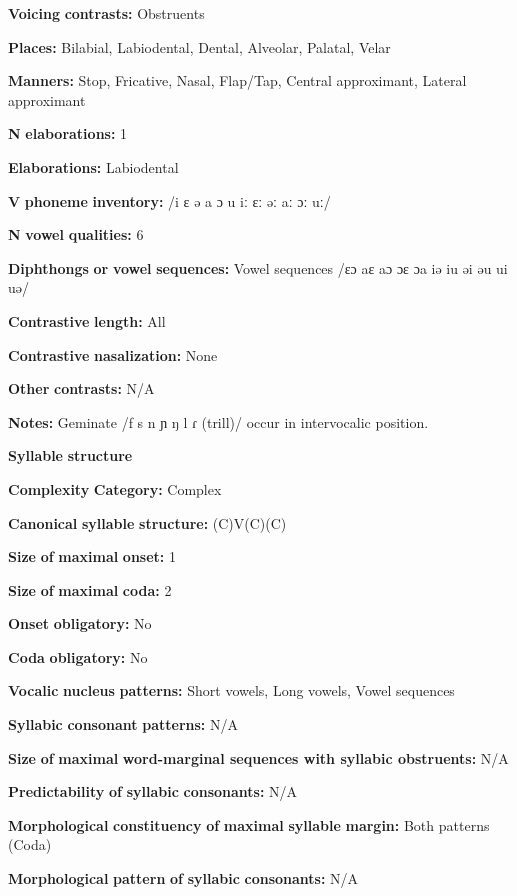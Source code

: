 \begin{styleBody}
\textbf{Voicing} \textbf{contrasts:} Obstruents

\textbf{Places:} Bilabial, Labiodental, Dental, Alveolar, Palatal, Velar

\textbf{Manners:} Stop, Fricative, Nasal, Flap/Tap, Central approximant, Lateral approximant

\textbf{N} \textbf{elaborations:} 1

\textbf{Elaborations:} Labiodental

\textbf{V} \textbf{phoneme} \textbf{inventory:} /i ɛ ə a ɔ u iː ɛː əː aː ɔː uː/

\textbf{N} \textbf{vowel} \textbf{qualities:} 6

\textbf{Diphthongs} \textbf{or} \textbf{vowel} \textbf{sequences:} Vowel sequences /ɛɔ aɛ aɔ ɔɛ ɔa iə iu əi əu ui uə/

\textbf{Contrastive} \textbf{length:} All

\textbf{Contrastive} \textbf{nasalization:} None

\textbf{Other} \textbf{contrasts:} N/A

\textbf{Notes:} Geminate /f s n ɲ ŋ l ɾ (trill)/ occur in intervocalic position.

\textbf{Syllable} \textbf{structure}

\textbf{Complexity} \textbf{Category:} Complex

\textbf{Canonical} \textbf{syllable} \textbf{structure:} (C)V(C)(C) \citep[36-43]{Stirtz2011}

\textbf{Size} \textbf{of} \textbf{maximal} \textbf{onset:} 1

\textbf{Size} \textbf{of} \textbf{maximal} \textbf{coda:} 2

\textbf{Onset} \textbf{obligatory:} No

\textbf{Coda} \textbf{obligatory:} No

\textbf{Vocalic} \textbf{nucleus} \textbf{patterns:} Short vowels, Long vowels, Vowel sequences

\textbf{Syllabic} \textbf{consonant} \textbf{patterns:} N/A

\textbf{Size} \textbf{of} \textbf{maximal} \textbf{word{}-marginal sequences with syllabic obstruents:} N/A

\textbf{Predictability} \textbf{of} \textbf{syllabic} \textbf{consonants:} N/A

\textbf{Morphological} \textbf{constituency} \textbf{of} \textbf{maximal} \textbf{syllable} \textbf{margin:} Both patterns (Coda)

\textbf{Morphological} \textbf{pattern} \textbf{of} \textbf{syllabic} \textbf{consonants:} N/A


\end{styleBody}

